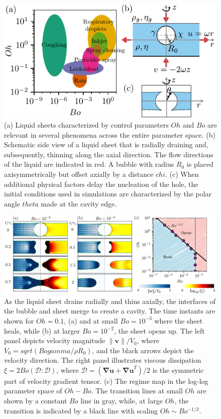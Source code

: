 \documentclass[reprint,amssymb,superscriptaddress,aps,prl,floatfix]{revtex4-2}
\def\chi{chi}%
\def\theta{theta}%
\def\gamma{gamma}%
\def\sqrt#1{sqrt(#1)}%
\begin{document}
\begin{figure}
	\includegraphics[width=\columnwidth]{Schematic_04.pdf}
  \caption{\label{fig:schematic} (a) Liquid sheets characterized by control parameters
  $Oh$ and $Bo$ are relevant in several phenomena across the entire parameter space. (b)
  Schematic side view of a liquid sheet that is radially draining and, subsequently, thinning
  along the axial direction. The flow directions of the liquid are indicated in red. A
bubble with radius $R_0$ is placed axisymmetrically but offset axially by a distance
$\chi$. (c) When additional physical factors delay the nucleation of the hole, the initial conditions
used in simulations are characterized by the polar angle $\theta$ made at the cavity edge.}
\end{figure}

\begin{figure}
	\includegraphics{Oh-Bo_07.pdf}
  \caption{\label{fig:driving} As the liquid sheet drains radially and thins axially, the
  interfaces of the bubble and sheet merge to create a cavity. The time instants are
shown for $Oh = 0.1$, (a) and at small $Bo = 10^{-3}$ where the sheet heals, while (b) at
larger $Bo=10^{-2}$, the sheet opens up. The left panel depicts velocity magnitude
$\|\boldsymbol{v}\|/V_0$, where $V_0 = \sqrt{Bo \gamma/\rho R_0}$, and the black arrows
depict the velocity direction. The right panel illustrates viscous dissipation $\xi = 2
Bo \left(\boldsymbol{\mathcal{D}:\mathcal{D}}\right)$, where $\boldsymbol{\mathcal{D}} =
\left(\boldsymbol{\nabla u + \nabla u}^T\right)/2$ is the symmetric part of velocity
gradient tensor. (c) The regime map in the log-log parameter space of $Oh-Bo$. The
transition lines at small $Oh$ are shown by a constant $Bo$ line in gray, while, at
large $Oh$, the transition is indicated by a black line with scaling $Oh \sim Bo^{-1/2}$.
}
\end{figure}
\end{document}
